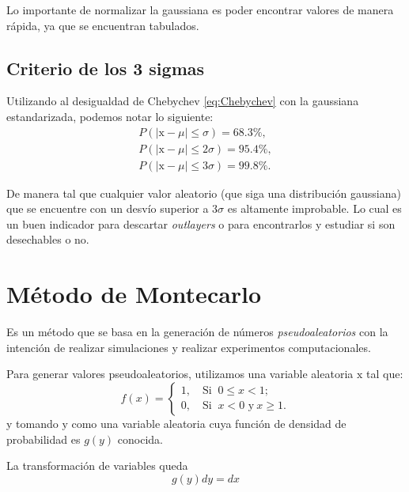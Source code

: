 \documentclass[openany]{book}
\begin{document}
Lo importante de normalizar la gaussiana es poder encontrar valores de manera rápida, ya que se encuentran tabulados.

\subsection{Criterio de los 3 sigmas}
Utilizando al desigualdad de Chebychev \eqref{eq:Chebychev} con la gaussiana estandarizada, podemos notar lo siguiente:
\begin{gather*}
  P(|\mathrm{x}-\mu|\leq\sigma)=68.3\%,\\
  P(|\mathrm{x}-\mu|\leq2\sigma)=95.4\%,\\
  P(|\mathrm{x}-\mu|\leq3\sigma)=99.8\%.
\end{gather*}
\par De manera tal que cualquier valor aleatorio (que siga una distribución gaussiana) que se encuentre con un desvío superior a $3\sigma$ es altamente improbable. Lo cual es un buen indicador para descartar \emph{outlayers} o para encontrarlos y estudiar si son desechables o no.

\section{Método de Montecarlo}
Es un método que se basa en la generación de números \emph{pseudoaleatorios} con la intención de realizar simulaciones y realizar experimentos computacionales.

\par Para generar valores pseudoaleatorios, utilizamos una variable aleatoria $\mathrm{x}$ tal que:
\begin{equation*}
  f(x)=\begin{cases}
    1,\quad\text{Si }~0\leq x< 1;\\
    0,\quad\text{Si }~x<0\,\,\text{y}~x\geq1.
  \end{cases}
\end{equation*}
y tomando $\mathrm{y}$ como una variable aleatoria cuya función de densidad de probabilidad es $g(y)$ conocida.
\par La transformación de variables queda
\begin{equation*}
  g(y)dy=dx
\end{equation*}
\end{document}
